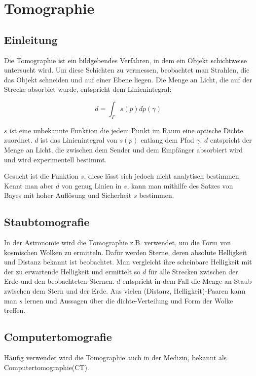 
\section{Tomographie}\label{k4.2.comptomo.ct}
\subsection{Einleitung}

Die Tomographie ist ein bildgebendes Verfahren, in dem ein Objekt schichtweise untersucht wird. Um diese Schichten zu vermessen, beobachtet man Strahlen, die das Objekt schneiden und auf einer Ebene liegen. Die Menge an Licht, die auf der Strecke absorbiet wurde, entspricht dem Linienintegral:

$$d=\int_{\Gamma}{}s(p)dp(\gamma)$$

$s$ ist eine unbekannte Funktion die jedem Punkt im Raum eine optische Dichte zuordnet. $d$ ist das Linienintegral von $s(p)$ entlang dem Pfad $\gamma$. $d$ entspricht der Menge an Licht, die zwischen dem Sender und dem Empfänger absorbiert wird und wird experimentell bestimmt.

Gesucht ist die Funktion $s$, diese lässt sich jedoch nicht analytisch bestimmen. Kennt man aber $d$ von genug Linien in $s$, kann man mithilfe des Satzes von Bayes mit hoher Auflösung und Sicherheit $s$ bestimmen.

\subsection{Staubtomografie}

In der Astronomie wird die Tomographie z.B. verwendet, um die Form von kosmischen Wolken zu ermitteln. Dafür werden Sterne, deren absolute Helligkeit und Distanz bekannt ist beobachtet. Man vergleicht ihre scheinbare Helligkeit mit der zu erwartende Helligkeit und ermittelt so $d$ für alle Strecken zwischen der Erde und den beobachteten Sternen. $d$ entspricht in dem Fall die Menge an Staub zwischen dem Stern und der Erde. Aus vielen (Distanz, Helligkeit)-Paaren kann man $s$ lernen und Aussagen über die dichte-Verteilung und Form der Wolke treffen.

\subsection{Computertomografie}

Häufig verwendet wird die Tomographie auch in der Medizin, bekannt als Computertomographie(CT).

